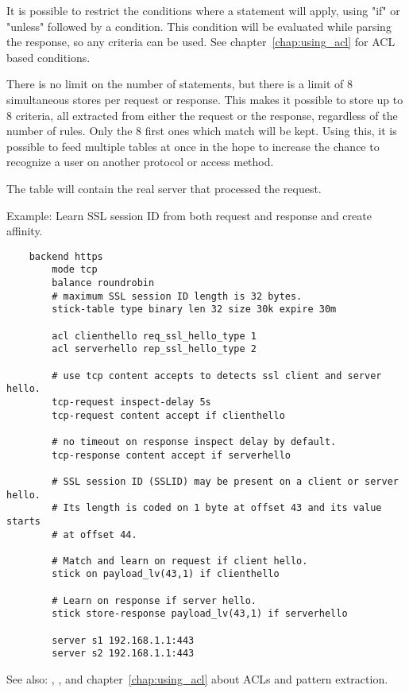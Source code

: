   It is possible to restrict the conditions where a 
  statement will apply, using "if" or "unless" followed by a condition. This
  condition will be evaluated while parsing the response, so any criteria can
  be used. See chapter~\ref{chap:using_acl} for ACL based conditions.

  There is no limit on the number of  statements, but
  there is a limit of 8 simultaneous stores per request or response. This
  makes it possible to store up to 8 criteria, all extracted from either the
  request or the response, regardless of the number of rules. Only the 8 first
  ones which match will be kept. Using this, it is possible to feed multiple
  tables at once in the hope to increase the chance to recognize a user on
  another protocol or access method.

  The table will contain the real server that processed the request.

  Example: Learn SSL session ID from both request and response and create affinity.
  \begin{verbatim}
    backend https
        mode tcp
        balance roundrobin
        # maximum SSL session ID length is 32 bytes.
        stick-table type binary len 32 size 30k expire 30m

        acl clienthello req_ssl_hello_type 1
        acl serverhello rep_ssl_hello_type 2

        # use tcp content accepts to detects ssl client and server hello.
        tcp-request inspect-delay 5s
        tcp-request content accept if clienthello

        # no timeout on response inspect delay by default.
        tcp-response content accept if serverhello

        # SSL session ID (SSLID) may be present on a client or server hello.
        # Its length is coded on 1 byte at offset 43 and its value starts
        # at offset 44.

        # Match and learn on request if client hello.
        stick on payload_lv(43,1) if clienthello

        # Learn on response if server hello.
        stick store-response payload_lv(43,1) if serverhello

        server s1 192.168.1.1:443
        server s2 192.168.1.1:443
  \end{verbatim}


See also: , , and chapter~\ref{chap:using_acl} about ACLs and pattern
             extraction.

